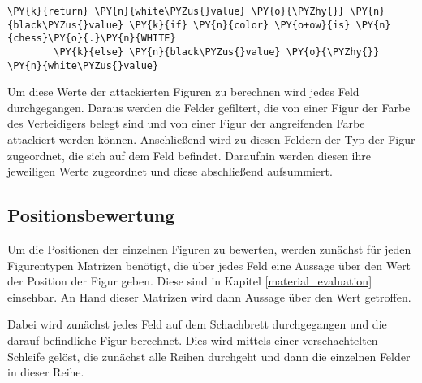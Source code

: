 \begin{Verbatim}[commandchars=\\\{\}]
             \PY{k}{return} \PY{n}{white\PYZus{}value} \PY{o}{\PYZhy{}} \PY{n}{black\PYZus{}value} \PY{k}{if} \PY{n}{color} \PY{o+ow}{is} \PY{n}{chess}\PY{o}{.}\PY{n}{WHITE} 
		\PY{k}{else} \PY{n}{black\PYZus{}value} \PY{o}{\PYZhy{}} \PY{n}{white\PYZus{}value}
\end{Verbatim}

    Um diese Werte der attackierten Figuren zu berechnen wird jedes Feld
durchgegangen. Daraus werden die Felder gefiltert, die von einer Figur
der Farbe des Verteidigers belegt sind und von einer Figur der
angreifenden Farbe attackiert werden können. Anschließend wird zu diesen
Feldern der Typ der Figur zugeordnet, die sich auf dem Feld befindet.
Daraufhin werden diesen ihre jeweiligen Werte zugeordnet und diese
abschließend aufsummiert.

    \subsection{Positionsbewertung}\label{positionsbewertung}

Um die Positionen der einzelnen Figuren zu bewerten, werden zunächst für
jeden Figurentypen Matrizen benötigt, die über jedes Feld eine Aussage
über den Wert der Position der Figur geben. Diese sind in Kapitel \ref{material_evaluation}
einsehbar. An Hand dieser Matrizen wird dann Aussage über den Wert
getroffen.

    Dabei wird zunächst jedes Feld auf dem Schachbrett durchgegangen und die
darauf befindliche Figur berechnet. Dies wird mittels einer
verschachtelten Schleife gelöst, die zunächst alle Reihen durchgeht und
dann die einzelnen Felder in dieser Reihe.

